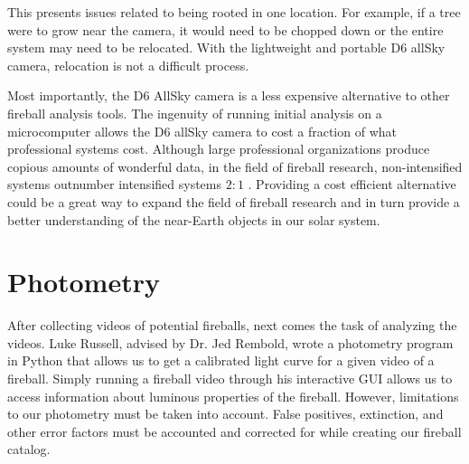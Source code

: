 This presents issues related to being rooted in one location.
For example, if a tree were to grow near the camera, it would need to be chopped down or the entire system may need to be relocated.
With the lightweight and portable D6 allSky camera, relocation is not a difficult process.

Most importantly, the D6 AllSky camera is a less expensive alternative to other fireball analysis tools. 
The ingenuity of running initial analysis on a microcomputer allows the D6 allSky camera to cost a fraction of what professional systems cost.
Although large professional organizations produce copious amounts of wonderful data, in the field of fireball research, non-intensified systems outnumber intensified systems $2:1$ \cite{gural_review_2005}.  
Providing a cost efficient alternative could be a great way to expand the field of fireball research and in turn provide a better understanding of the near-Earth objects in our solar system.


\section{Photometry}
After collecting videos of potential fireballs, next comes the task of analyzing the videos.
Luke Russell, advised by Dr. Jed Rembold, wrote a photometry program in Python that allows us to get a calibrated light curve for a given video of a fireball.
Simply running a fireball video through his interactive GUI allows us to access information about luminous properties of the fireball.
However, limitations to our photometry must be taken into account.
False positives, extinction, and other error factors must be accounted and corrected for while creating our fireball catalog.

